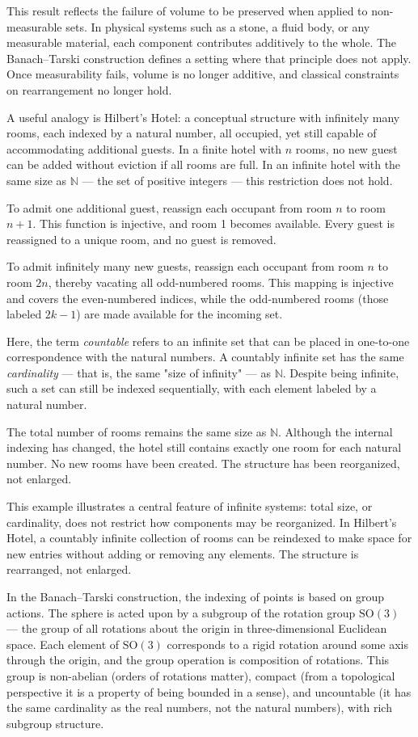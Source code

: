 This result reflects the failure of volume to be preserved when applied to non-measurable sets. In physical systems such as a stone, a fluid body, or any measurable material, each component contributes additively to the whole. The Banach–Tarski construction defines a setting where that principle does not apply. Once measurability fails, volume is no longer additive, and classical constraints on rearrangement no longer hold.

A useful analogy is Hilbert’s Hotel: a conceptual structure with infinitely many rooms, each indexed by a natural number, all occupied, yet still capable of accommodating additional guests. In a finite hotel with $n$ rooms, no new guest can be added without eviction if all rooms are full. In an infinite hotel with the same size as $\mathbb{N}$ — the set of positive integers — this restriction does not hold.

To admit one additional guest, reassign each occupant from room $n$ to room $n+1$. This function is injective, and room 1 becomes available. Every guest is reassigned to a unique room, and no guest is removed.

To admit infinitely many new guests, reassign each occupant from room $n$ to room $2n$, thereby vacating all odd-numbered rooms. This mapping is injective and covers the even-numbered indices, while the odd-numbered rooms (those labeled $2k-1$) are made available for the incoming set.

Here, the term \emph{countable} refers to an infinite set that can be placed in one-to-one correspondence with the natural numbers. A countably infinite set has the same \emph{cardinality} — that is, the same "size of infinity" — as $\mathbb{N}$. Despite being infinite, such a set can still be indexed sequentially, with each element labeled by a natural number.

The total number of rooms remains the same size as $\mathbb{N}$. Although the internal indexing has changed, the hotel still contains exactly one room for each natural number. No new rooms have been created. The structure has been reorganized, not enlarged.

This example illustrates a central feature of infinite systems: total size, or cardinality, does not restrict how components may be reorganized. In Hilbert’s Hotel, a countably infinite collection of rooms can be reindexed to make space for new entries without adding or removing any elements. The structure is rearranged, not enlarged.

In the Banach–Tarski construction, the indexing of points is based on group actions. The sphere is acted upon by a subgroup of the rotation group $\mathrm{SO}(3)$ — the group of all rotations about the origin in three-dimensional Euclidean space. Each element of $\mathrm{SO}(3)$ corresponds to a rigid rotation around some axis through the origin, and the group operation is composition of rotations. This group is non-abelian (orders of rotations matter), compact (from a topological perspective it is a property of being bounded in a sense), and uncountable (it has the same cardinality as the real numbers, not the natural numbers), with rich subgroup structure.

